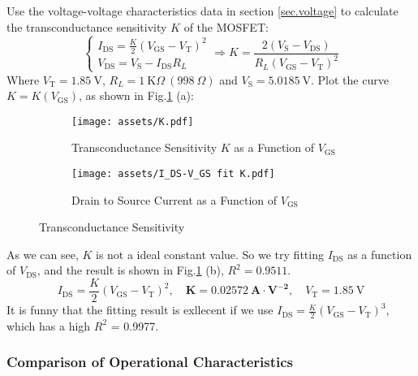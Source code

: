 \documentclass[UTF8]{report}
\def\KO{\ \mathrm{K}\Omega}
\theoremstyle{MyLineTheoremStyle} %
\theoremstyle{MyBlockTheoremStyle} %
\theoremstyle{MySubsubsectionStyle} %
\begin{document}
Use the voltage-voltage characteristics data in section \ref{sec.voltage} to calculate the transconductance sensitivity $K$ of the MOSFET:
\begin{equation}
    \begin{cases}
        I_\text{DS} = \frac{K}{2} \left(V_\text{GS} - V_\text{T}\right)^2 \\ 
        V_\text{DS} = V_\text{S} - I_\text{DS} R_L
    \end{cases}
\Longrightarrow K = \frac{2 \left(V_\text{S} - V_\text{DS}\right)}{R_L \left(V_\text{GS} - V_\text{T}\right)^2}
\end{equation}
Where $V_\text{T} = 1.85 \ \mathrm{V}$, $R_L = 1 \KO\ (998\ \Omega)$ and $V_\text{S} = 5.0185 \ \mathrm{V}$. Plot the curve $K = K(V_\text{GS})$, as shown in Fig.\ref{Transconductance Sensitivity} (a):
\begin{figure}[H]\centering
\begin{subfigure}[b]{0.5\columnwidth}\centering
    \texttt{[image: assets/K.pdf]}
    \caption{Transconductance Sensitivity $K$ as a Function of $V_\text{GS}$}
\end{subfigure}\hfill
\begin{subfigure}[b]{0.5\columnwidth}\centering
    \texttt{[image: assets/I\_DS-V\_GS fit K.pdf]}
    \caption{Drain to Source Current as a Function of $V_\text{GS}$ }
\end{subfigure}
\caption{Transconductance Sensitivity}
\label{Transconductance Sensitivity}
\end{figure}
As we can see, $K$ is not a ideal constant value. So we try fitting $I_\text{DS}$ as a function of $V_\text{DS}$, and the result is shown in Fig.\ref{Transconductance Sensitivity} (b), $R^2 = 0.9511$.
\begin{equation}
I_\text{DS} = \frac{K}{2}\left(V_\text{GS} - V_\text{T}\right)^2,\quad \mathbf{K = 0.02572 \ A\cdot V^{-2}},\quad V_\text{T} = 1.85 \ \mathrm{V}
\end{equation}
It is funny that the fitting result is exllecent if we use $I_\text{DS} = \frac{K}{2}\left(V_\text{GS} - V_\text{T}\right)^3$, which has a high $R^2$ = 0.9977.

\subsubsection{Comparison of Operational Characteristics}
\end{document}
